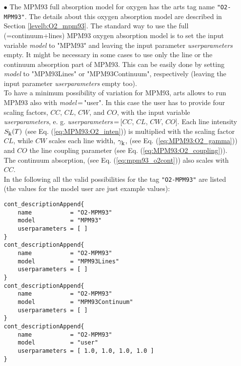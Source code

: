 \begin{itemize}
\item[$\bullet$] The MPM93 full absorption model for oxygen \citep{liebeetal:93}
     has the arts tag name {\tt "O2-MPM93"}. The details about this 
     oxygen absorption model are described in Section \ref{levelb:O2_mpm93}. 
     The standard way to use the full (=continuum+lines) MPM93 oxygen 
     absorption model is to set the input variable {\it model} 
     to "MPM93" and leaving the input parameter {\it userparameters} empty. 
     It might be necessary in some cases to use only the line or the 
     continuum absorption part of MPM93. This can be easily done 
     by setting {\it model} to "MPM93Lines" or "MPM93Continuum", 
     respectively (leaving the input parameter {\it userparameters} 
     empty too).\\ To have a minimum possibility of variation for MPM93, 
     arts allows to run MPM93 also with {\it model}\,=\,"user". 
     In this case the user has to provide four scaling factors,  
     $CC$, $CL$, $CW$, and $CO$, with the input variable {\it userparameters}, 
     e. g. {\it userparameters}\,=\,$[$$CC$, $CL$, $CW$, $CO$$]$. 
     Each line intensity $S_{\mbox{\rm \small k}}(T)$ (see Eq. (\ref{eq:MPM93:O2_inten})) 
     is multiplied with the scaling factor $CL$, while $CW$ scales 
     each line width, $\gamma_{\mbox{\rm \small k}}$, (see Eq. (\ref{eq:MPM93:O2_gamma})) and 
     $CO$ the line coupling parameter (see Eq. (\ref{eq:MPM93:O2_coupling})). 
     The continuum absorption, (see Eq. (\ref{eq:mpm93_o2cont})) 
     also scales with $CC$.\\
     In the following all the valid possibilities for the
     tag {\tt "O2-MPM93"} are listed (the values for the 
     model user are just example values):
\begin{verbatim}
cont_descriptionAppend{
    name           = "O2-MPM93"
    model          = "MPM93"
    userparameters = [ ]
}
cont_descriptionAppend{
    name           = "O2-MPM93"
    model          = "MPM93Lines"
    userparameters = [ ]
}
cont_descriptionAppend{
    name           = "O2-MPM93"
    model          = "MPM93Continuum"
    userparameters = [ ]
}
cont_descriptionAppend{
    name           = "O2-MPM93"
    model          = "user"
    userparameters = [ 1.0, 1.0, 1.0, 1.0 ]
}
\end{verbatim}


\end{itemize}
